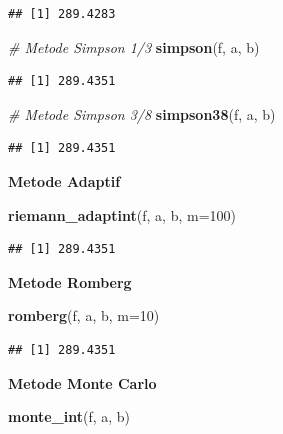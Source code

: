 \documentclass[]{book}
\newenvironment{Shaded}{\begin{snugshade}}{\end{snugshade}}
\newcommand{\CommentTok}[1]{\textcolor[rgb]{0.56,0.35,0.01}{\textit{#1}}}
\newcommand{\DataTypeTok}[1]{\textcolor[rgb]{0.13,0.29,0.53}{#1}}
\newcommand{\DecValTok}[1]{\textcolor[rgb]{0.00,0.00,0.81}{#1}}
\newcommand{\KeywordTok}[1]{\textcolor[rgb]{0.13,0.29,0.53}{\textbf{#1}}}
\newcommand{\NormalTok}[1]{#1}
\theoremstyle{definition}
\theoremstyle{definition}
\theoremstyle{definition}
\theoremstyle{remark}
\begin{document}
\begin{verbatim}
## [1] 289.4283
\end{verbatim}

\begin{Shaded}
\begin{Highlighting}[]
\CommentTok{# Metode Simpson 1/3}
\KeywordTok{simpson}\NormalTok{(f, a, b)}
\end{Highlighting}
\end{Shaded}

\begin{verbatim}
## [1] 289.4351
\end{verbatim}

\begin{Shaded}
\begin{Highlighting}[]
\CommentTok{# Metode Simpson 3/8}
\KeywordTok{simpson38}\NormalTok{(f, a, b)}
\end{Highlighting}
\end{Shaded}

\begin{verbatim}
## [1] 289.4351
\end{verbatim}

\textbf{Metode Adaptif}

\begin{Shaded}
\begin{Highlighting}[]
\KeywordTok{riemann_adaptint}\NormalTok{(f, a, b, }\DataTypeTok{m=}\DecValTok{100}\NormalTok{)}
\end{Highlighting}
\end{Shaded}

\begin{verbatim}
## [1] 289.4351
\end{verbatim}

\textbf{Metode Romberg}

\begin{Shaded}
\begin{Highlighting}[]
\KeywordTok{romberg}\NormalTok{(f, a, b, }\DataTypeTok{m=}\DecValTok{10}\NormalTok{)}
\end{Highlighting}
\end{Shaded}

\begin{verbatim}
## [1] 289.4351
\end{verbatim}

\textbf{Metode Monte Carlo}

\begin{Shaded}
\begin{Highlighting}[]
\KeywordTok{monte_int}\NormalTok{(f, a, b)}
\end{Highlighting}
\end{Shaded}
\end{document}
